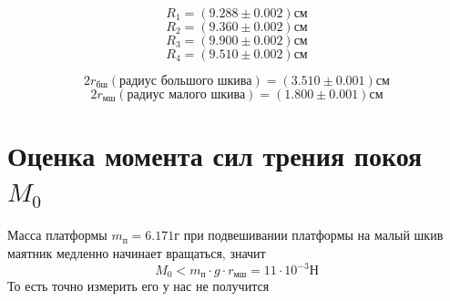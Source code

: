 \documentclass[a4paper,12pt]{article} %
\begin{document}
\[R_1 = (9.288\pm0.002)\text{см}\]
\[R_2 = (9.360\pm0.002)\text{см}\]
\[R_3 = (9.900\pm0.002)\text{см}\]
\[R_4 = (9.510\pm0.002)\text{см}\]

\[2r_{\text{бш}}(\text{радиус большого шкива}) = (3.510\pm0.001)\text{см}\]
\[2r_{\text{мш}}(\text{радиус малого шкива}) = (1.800\pm0.001)\text{см}\]



\section{Оценка момента сил трения покоя $M_0$}
Масса платформы $m_{\text{п}} = 6.171\text{г}$ при подвешивании платформы на малый шкив маятник медленно начинает вращаться, значит
\[M_0 < m_{\text{п}}\cdot g\cdot r_{\text{мш}} = 11 \cdot 10^{-3} \text{Н}\]
То есть точно измерить его у нас не получится
\end{document}

